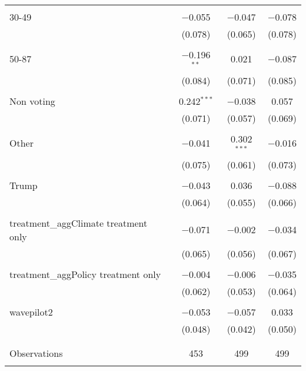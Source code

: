 \begin{tabular}{@{\extracolsep{5pt}}lccc}
  & & & \\ 
 30-49 & $-$0.055 & $-$0.047 & $-$0.078 \\ 
  & (0.078) & (0.065) & (0.078) \\ 
  & & & \\ 
 50-87 & $-$0.196$^{**}$ & 0.021 & $-$0.087 \\ 
  & (0.084) & (0.071) & (0.085) \\ 
  & & & \\ 
 Non voting & 0.242$^{***}$ & $-$0.038 & 0.057 \\ 
  & (0.071) & (0.057) & (0.069) \\ 
  & & & \\ 
 Other & $-$0.041 & 0.302$^{***}$ & $-$0.016 \\ 
  & (0.075) & (0.061) & (0.073) \\ 
  & & & \\ 
 Trump & $-$0.043 & 0.036 & $-$0.088 \\ 
  & (0.064) & (0.055) & (0.066) \\ 
  & & & \\ 
 treatment\_aggClimate treatment only & $-$0.071 & $-$0.002 & $-$0.034 \\ 
  & (0.065) & (0.056) & (0.067) \\ 
  & & & \\ 
 treatment\_aggPolicy treatment only & $-$0.004 & $-$0.006 & $-$0.035 \\ 
  & (0.062) & (0.053) & (0.064) \\ 
  & & & \\ 
 wavepilot2 & $-$0.053 & $-$0.057 & 0.033 \\ 
  & (0.048) & (0.042) & (0.050) \\ 
  & & & \\ 
\hline \\[-1.8ex] 

Observations & 453 & 499 & 499 \\ 
\hline 
\hline \\[-1.8ex] 
\end{tabular} 